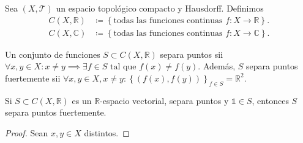 \begin{frame}

	\frametitle{\secname}

	\begin{definition}
		Sea $\left(X, \mathcal{T}\right)$ un espacio topológico compacto
		y Hausdorff.
		Definimos
		\begin{align*}
			C\left(X,\mathds{R}\right) & \coloneqq
			\left\{\text{todas las funciones continuas }f\colon X\to\mathds{R}
			\right\}.                              \\
			C\left(X,\mathds{C}\right) & \coloneqq
			\left\{\text{todas las funciones continuas }f\colon X\to\mathds{C}
			\right\}.
		\end{align*}
	\end{definition}

	\begin{definition}
		Un conjunto de funciones
		$S\subset C\left(X,\mathds{R}\right)$
		\alert{separa puntos} sii
		\begin{math}
			\forall x,y\in X:
			x\neq y\implies
			\exists f\in S
			\text{ tal que }
			f\left(x\right)\neq f\left(y\right)
		\end{math}.
		Además, $S$ \alert{separa puntos fuertemente} sii
		\begin{math}
			\forall x,y\in X,x\neq y:
			\left\{
			\left(
			f\left(x\right),
			f\left(y\right)
			\right)
			\right\}_{f\in S}=
			\mathds{R}^{2}
		\end{math}.
	\end{definition}

	\begin{theorem}
		Si $S\subset C\left(X,\mathds{R}\right)$ es un $\mathds{R}$-espacio vectorial,
		separa puntos y $\mathds{1}\in S$, entonces $S$ separa puntos fuertemente.
	\end{theorem}

	\begin{proof}
		Sean $x,y\in X$ distintos.
	\end{proof}
\end{frame}